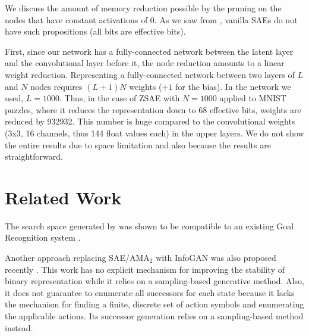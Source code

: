 We discuss the amount of memory reduction possible by the pruning on the nodes
that have constant activations of 0. As we saw from ,
vanilla SAEs do not have such propositions (all bits are effective bits).

First, since our network has a fully-connected network between the
latent layer and the convolutional layer before it, the node reduction
amounts to a linear weight reduction.  Representing a fully-connected
network between two layers of $L$ and $N$ nodes requires $(L+1)N$
weights ($+1$ for the bias).
In the network we used, $L=1000$. Thus, in the case of ZSAE with $N=1000$ applied to MNIST puzzles,
where it reduces the representation down to 68 effective bits, weights are reduced by 932932.
This number is huge compared to the convolutional weights (3x3, 16 channels, thus 144 float values each) in the upper layers.
We do not show the entire results due to space limitation and also because the results are straightforward.


\section{Related Work}

The search space generated by \latentplanner was shown to be compatible
to an existing Goal Recognition system \cite{amado2018goal,amado2018goalb}.

Another approach replacing SAE/AMA$_2$ with InfoGAN was also proposed recently \cite{kurutach2018learning}.
This work has no explicit mechanism for improving the stability of binary representation
while it relies on a sampling-based generative method.
Also, it does not guarantee to enumerate all successors for each state
because it lacks the mechanism for finding a finite, discrete set of action symbols
and enumerating the applicable actions.
Its successor generation relies on a sampling-based method instead.

